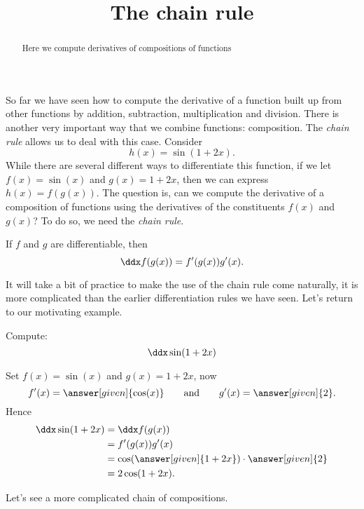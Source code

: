 \documentclass{ximera}
\title[Dig-In:]{The chain rule}
\begin{document}
\begin{abstract}
  Here we compute derivatives of compositions of functions
\end{abstract}
\maketitle


So far we have seen how to compute the derivative of a function built
up from other functions by addition, subtraction, multiplication and
division. There is another very important way that we combine
functions: composition. The \textit{chain rule} allows us to deal with
this case. Consider
\[ h(x) = \sin(1+2x). \] 
While there are several different ways to differentiate this function,
if we let $f(x) = \sin(x)$ and $g(x) = 1+2x$, then we can express
$h(x) = f(g(x))$. The question is, can we compute the derivative of a
composition of functions using the derivatives of the constituents
$f(x)$ and $g(x)$? To do so, we need the \textit{chain rule}.



\begin{theorem}
	If $f$ and $g$ are differentiable, then
	\[ \ddx f(g(x)) = f'(g(x))g'(x). \]
\end{theorem}



It will take a bit of practice to make the use of the chain rule come
naturally, it is more complicated than the earlier differentiation
rules we have seen. Let's return to our motivating example.

\begin{example}
	Compute:
	\[ \ddx \sin(1+2x) \]
	
	\begin{explanation}
		Set $f(x) = \sin(x)$ and $g(x) = 1+2x$, now
		\[ f'(x) = \answer[given]{\cos(x)} \qquad\text{and}\qquad g'(x) = \answer[given]{2}.\]
		Hence
		\begin{align*}
			\ddx \sin(1+2x) &= \ddx f(g(x))\\ 
				&=f'(g(x))g'(x) \\
				&= \cos(\answer[given]{1+2x})\cdot \answer[given]{2}\\
				&= 2\cos(1+2x).
		\end{align*}
	\end{explanation}
\end{example}


Let's see a more complicated chain of compositions.
\end{document}
